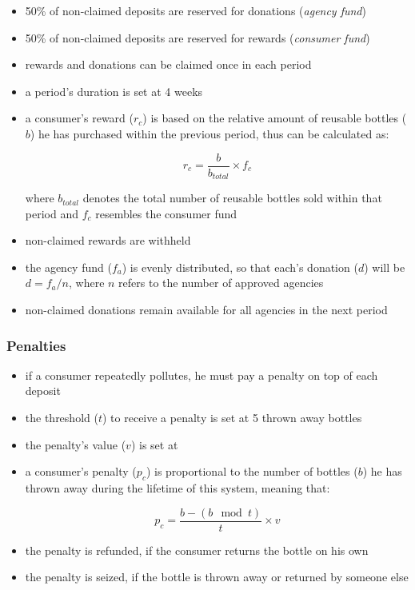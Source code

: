 \begin{itemize}
 	\item 50\% of non-claimed deposits are reserved for donations (\textit{agency fund})
  	\item 50\% of non-claimed deposits are reserved for rewards (\textit{consumer fund})
  	\item rewards and donations can be claimed once in each period
  	\item a period's duration is set at 4 weeks
  	\item a consumer's reward ($r_c$) is based on the relative amount of reusable bottles ($b$) he has purchased within the previous period, thus can be calculated as:

\begin{equation}
r_c = \frac{b}{b_{total}} \times f_c
\label{eq:rewardCalculation}
\end{equation}

where $b_{total}$ denotes the total number of reusable bottles sold within that period and $f_c$ resembles the consumer fund

	\item non-claimed rewards are withheld %
  	\item the agency fund ($f_a$) is evenly distributed, so that each's donation ($d$) will be $d = f_a/n$, where $n$ refers to the number of approved agencies
  	\item non-claimed donations remain available for all agencies in the next period
\end{itemize}

\subsubsection{Penalties}

\begin{itemize}
 	\item if a consumer repeatedly pollutes, he must pay a penalty on top of each deposit
	\item the threshold ($t$) to receive a penalty is set at 5 thrown away bottles
  	\item the penalty's value ($v$) is set at 
  	\item a consumer's penalty ($p_c$) is proportional to the number of bottles ($b$) he has thrown away during the lifetime of this system, meaning that: 

\begin{equation}
p_c = \frac{b - (b \mod t)}{t} \times v
\label{eq:penaltyCalculcation}
\end{equation}

  	\item the penalty is refunded, if the consumer returns the bottle on his own
  	\item the penalty is seized, if the bottle is thrown away or returned by someone else
\end{itemize}

